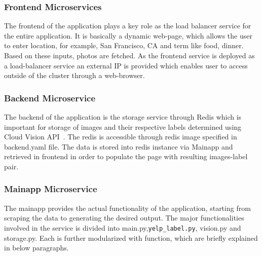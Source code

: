 \subsubsection{Frontend Microservices} 

The frontend of the application plays a key role as the load balancer
service for the entire application. It is basically a dynamic
web-page, which allows the user to enter location, for example, San
Francisco, CA and term like food, dinner. Based on these inputs,
photos are fetched. As the frontend service is deployed as a
load-balancer service an external IP is provided which enables user to
access outside of the cluster through a web-browser.

\subsubsection{Backend Microservice} 

The backend of the application is the storage service through Redis
which is important for storage of images and their respective labels
determined using Cloud Vision API~\cite{hid-sp18-602-redis}. The redis
is accessible through redis image specified in backend.yaml file. The
data is stored into redis instance via Mainapp and retrieved in
frontend in order to populate the page with resulting images-label
pair.

\subsubsection{Mainapp Microservice}

The mainapp provides the actual functionality of the application,
starting from scraping the data to generating the desired output. The
major functionalities involved in the service is divided into
main.py,\verb|yelp_label.py|, vision.py and storage.py. Each is further
modularized with function, which are briefly explained in below
paragraphs.

